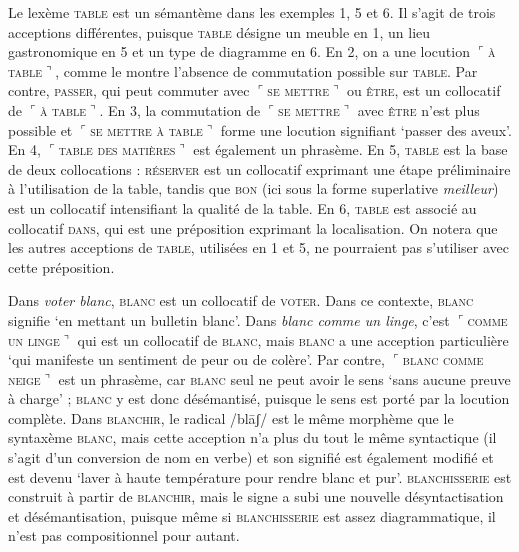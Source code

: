 {\begin{enumerate}
    \end{enumerate}

     Le lexème \textsc{table} est un sémantème dans les exemples 1, 5 et 6. Il s’agit de trois acceptions différentes, puisque \textsc{table} désigne un meuble en 1, un lieu gastronomique en 5 et un type de diagramme en 6. En 2, on a une locution \textrm{$⌜$}\textsc{à} \textsc{table}\textrm{$⌝$}, comme le montre l’absence de commutation possible sur \textsc{table}. Par contre, \textsc{passer}, qui peut commuter avec \textrm{$⌜$}\textsc{se} \textsc{mettre}\textrm{$⌝$} ou \textsc{être}, est un collocatif de \textrm{$⌜$}\textsc{à} \textsc{table}\textrm{$⌝$}. En 3, la commutation de \textrm{$⌜$}\textsc{se} \textsc{mettre}\textrm{$⌝$} avec \textsc{être} n’est plus possible et \textrm{$⌜$}\textsc{se} \textsc{mettre} \textsc{à} \textsc{table}\textrm{$⌝$} forme une locution signifiant ‘passer des aveux’. En 4, \textrm{$⌜$}\textsc{table} \textsc{des} \textsc{matières}\textrm{$⌝$} est également un phrasème. En 5, \textsc{table} est la base de deux collocations : \textsc{réserver} est un collocatif exprimant une étape préliminaire à l'utilisation de la table, tandis que \textsc{bon} (ici sous la forme superlative \textit{meilleur}) est un collocatif intensifiant la qualité de la table. En 6, \textsc{table} est associé au collocatif \textsc{dans}, qui est une préposition exprimant la localisation. On notera que les autres acceptions de \textsc{table}, utilisées en 1 et 5, ne pourraient pas s'utiliser avec cette préposition.

     Dans \textit{voter blanc}, \textsc{blanc} est un collocatif de \textsc{voter}. Dans ce contexte, \textsc{blanc} signifie ‘en mettant un bulletin blanc’. Dans \textit{blanc comme un linge}, c’est \textrm{$⌜$}\textsc{comme} \textsc{un} \textsc{linge}\textrm{$⌝$} qui est un collocatif de \textsc{blanc}, mais \textsc{blanc} a une acception particulière ‘qui manifeste un sentiment de peur ou de colère’. Par contre, \textrm{$⌜$}\textsc{blanc} \textsc{comme} \textsc{neige}\textrm{$⌝$} est un phrasème, car \textsc{blanc} seul ne peut avoir le sens ‘sans aucune preuve à charge’ ; \textsc{blanc} y est donc désémantisé, puisque le sens est porté par la locution complète. Dans \textsc{blanchir,} le radical /blāʃ/ est le même morphème que le syntaxème \textsc{blanc}, mais cette acception n’a plus du tout le même syntactique (il s’agit d’un conversion de nom en verbe) et son signifié est également modifié et est devenu ‘laver à haute température pour rendre blanc et pur’. \textsc{blanchisserie} est construit à partir de \textsc{blanchir}, mais le signe a subi une nouvelle désyntactisation et désémantisation, puisque même si \textsc{blanchisserie} est assez diagrammatique, il n’est pas compositionnel pour autant.
}
